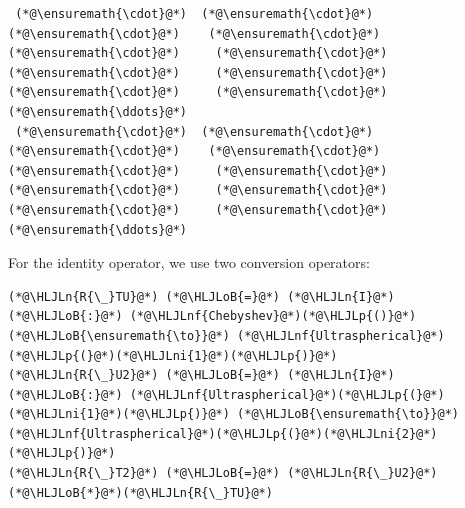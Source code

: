 \documentclass[12pt,a4paper]{article}
\newcommand{\HLJLn}[1]{#1}
\newcommand{\HLJLnf}[1]{\textcolor[RGB]{66,102,213}{#1}}
\newcommand{\HLJLni}[1]{\textcolor[RGB]{59,151,46}{#1}}
\newcommand{\HLJLoB}[1]{\textcolor[RGB]{102,102,102}{\textbf{#1}}}
\newcommand{\HLJLp}[1]{#1}
\begin{document}
\begin{lstlisting}
 (*@\ensuremath{\cdot}@*)  (*@\ensuremath{\cdot}@*)   (*@\ensuremath{\cdot}@*)    (*@\ensuremath{\cdot}@*)    (*@\ensuremath{\cdot}@*)     (*@\ensuremath{\cdot}@*)     (*@\ensuremath{\cdot}@*)     (*@\ensuremath{\cdot}@*)     (*@\ensuremath{\cdot}@*)     (*@\ensuremath{\cdot}@*)   (*@\ensuremath{\ddots}@*)
 (*@\ensuremath{\cdot}@*)  (*@\ensuremath{\cdot}@*)   (*@\ensuremath{\cdot}@*)    (*@\ensuremath{\cdot}@*)    (*@\ensuremath{\cdot}@*)     (*@\ensuremath{\cdot}@*)     (*@\ensuremath{\cdot}@*)     (*@\ensuremath{\cdot}@*)     (*@\ensuremath{\cdot}@*)     (*@\ensuremath{\cdot}@*)   (*@\ensuremath{\ddots}@*)
\end{lstlisting}


For the identity operator, we use two conversion operators:


\begin{lstlisting}
(*@\HLJLn{R{\_}TU}@*) (*@\HLJLoB{=}@*) (*@\HLJLn{I}@*) (*@\HLJLoB{:}@*) (*@\HLJLnf{Chebyshev}@*)(*@\HLJLp{()}@*) (*@\HLJLoB{\ensuremath{\to}}@*) (*@\HLJLnf{Ultraspherical}@*)(*@\HLJLp{(}@*)(*@\HLJLni{1}@*)(*@\HLJLp{)}@*)
(*@\HLJLn{R{\_}U2}@*) (*@\HLJLoB{=}@*) (*@\HLJLn{I}@*) (*@\HLJLoB{:}@*) (*@\HLJLnf{Ultraspherical}@*)(*@\HLJLp{(}@*)(*@\HLJLni{1}@*)(*@\HLJLp{)}@*) (*@\HLJLoB{\ensuremath{\to}}@*) (*@\HLJLnf{Ultraspherical}@*)(*@\HLJLp{(}@*)(*@\HLJLni{2}@*)(*@\HLJLp{)}@*)
(*@\HLJLn{R{\_}T2}@*) (*@\HLJLoB{=}@*) (*@\HLJLn{R{\_}U2}@*)(*@\HLJLoB{*}@*)(*@\HLJLn{R{\_}TU}@*)
\end{lstlisting}
\end{document}
